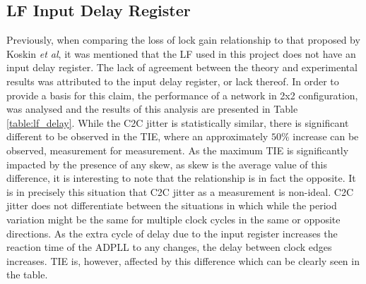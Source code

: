 \subsection{\ac{LF} Input Delay Register}\label{subsection:lf_delay}
Previously, when comparing the loss of lock gain relationship to that proposed by Koskin \textit{et al}, it was mentioned that the \ac{LF} used in this project does not have an input delay register. The lack of agreement between the theory and experimental results was attributed to the input delay register, or lack thereof. In order to provide a basis for this claim, the performance of a network in 2x2 configuration, was analysed and the results of this analysis are presented in Table \ref{table:lf_delay}. While the \ac{C2C} jitter is statistically similar, there is significant different to be observed in the \ac{TIE}, where an approximately $50\%$ increase can be observed, measurement for measurement. As the maximum \ac{TIE} is significantly impacted by the presence of any skew, as skew is the average value of this difference, it is interesting to note that the relationship is in fact the opposite. It is in precisely this situation that \ac{C2C} jitter as a measurement is non-ideal. \ac{C2C} jitter does not differentiate between the situations in which while the period variation might be the same for multiple clock cycles in the same or opposite directions. As the extra cycle of delay due to the input register increases the reaction time of the \ac{ADPLL} to any changes, the delay between clock edges increases. \ac{TIE} is, however, affected by this difference which can be clearly seen in the table.

